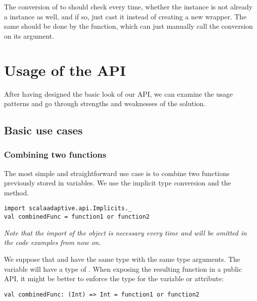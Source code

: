 The conversion of  to  should check every time, whether the  instance is not already a  instance as well, and if so, just cast it instead of creating a new wrapper. The same should be done by the  function, which can just manually call the conversion on its argument.

\section{Usage of the API}
\label{sec:api_usage}

After having designed the basic look of our API, we can examine the usage patterns and go through strengths and weaknesses of the solution.

\subsection{Basic use cases}

\subsubsection{Combining two functions}

The most simple and straightforward use case is to combine two functions previously stored in variables. We use the implicit type conversion and the  method.

\lstset{style=Scala}
\begin{lstlisting}
import scalaadaptive.api.Implicits._
val combinedFunc = function1 or function2
\end{lstlisting}

\textit{Note that the import of the  object is necessary every time and will be omitted in the code examples from now on.}

We suppose that  and  have the same type  with the same type arguments. The  variable will have a type of . When exposing the resulting function in a public API, it might be better to enforce the  type for the variable or attribute:

\lstset{style=Scala}
\begin{lstlisting}
val combinedFunc: (Int) => Int = function1 or function2
\end{lstlisting}

